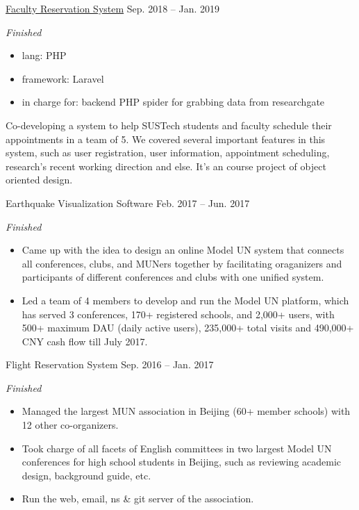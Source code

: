 \documentclass[hidelinks__VERSION__]{adamyi-cv}
\begin{document}
\begin{entrylist}

\entry
{\href{https://github.com/zhaoweizhong/Faculty-Reservation}{Faculty Reservation System}}
{Sep. 2018 -- Jan. 2019}
{\emph{Finished}
\begin{itemize}
\item lang: PHP
\item framework: Laravel
\item in charge for: backend PHP spider for grabbing data from researchgate
\end{itemize}
Co-developing a system to help SUSTech students and faculty schedule their appointments in a team of 5. We covered several important features in this system, such as user registration, user information, appointment scheduling, research's recent working direction and else. It's an course project of object oriented design.
}



\entry
{Earthquake Visualization Software}
{Feb. 2017 -- Jun. 2017}
{\emph{Finished}
\begin{itemize}
\item Came up with the idea to design an online Model UN system that connects all conferences, clubs, and MUNers together by facilitating oraganizers and participants of different conferences and clubs with one unified system.
\item Led a team of 4 members to develop and run the Model UN platform, which has served 3 conferences, 170+ registered schools, and 2,000+ users, with 500+ maximum DAU (daily active users), 235,000+ total visits and 490,000+ CNY cash flow till July 2017.
\end{itemize}}


\entry
{Flight Reservation System}
{Sep. 2016 -- Jan. 2017}
{\emph{Finished}
\begin{itemize}
\item Managed the largest MUN association in Beijing (60+ member schools) with 12 other co-organizers.
\item Took charge of all facets of English committees in two largest Model UN conferences for high school students in Beijing, such as reviewing academic design, background guide, etc.
\item Run the web, email, ns \& git server of the association.
\end{itemize}}


\end{entrylist}
\end{document}
